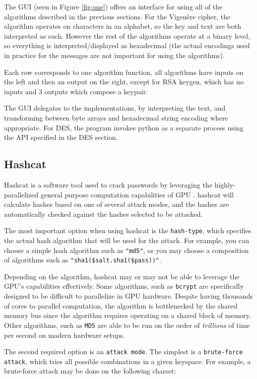 \documentclass[acmlarge]{acmart}
\begin{document}
The GUI (seen in Figure \ref{fig:one}) offers an interface for using all of the algorithms described in the previous sections. For the Vigen\`{e}re cipher, the algorithm operates on characters in an alphabet, so the key and text are both interpreted as such. However the rest of the algorithms operate at a binary level, so everything is interpreted/displayed as hexadecimal (the actual encodings used in practice for the messages are not important for using the algorithms).

Each row corresponds to one algorithm function, all algorithms have inputs on the left and then an output on the right, except for RSA keygen, which has no inputs and 3 outputs which compose a keypair.

The GUI delegates to the implementations, by interpreting the text, and transforming between byte arrays and hexadecimal string encoding where appropriate. For DES, the program invokes python as a separate process using the API specified in the DES section.

\subsection{Hashcat}\label{sec:hashcat}

Hashcat is a software tool used to crack passwords by leveraging the highly-parallelized general purpose computation capabilities of GPU \cite{Hashcat}. hashcat will calculate hashes based on one of several attack modes, and the hashes are automatically checked against the hashes selected to be attacked.

The most important option when using hashcat is the \texttt{hash-type}, which specifies the actual hash algorithm that will be used for the attack. For example, you can choose a simple hash algorithm such as \texttt{"md5"}, or you may choose a composition of algorithms such as \texttt{"sha1(\$salt.sha1(\$pass))"}.

Depending on the algorithm, hashcat may or may not be able to leverage the GPU's capabilities effectively. Some algorithms, such as \texttt{bcrypt} are specifically designed to be difficult to parallelize in GPU hardware. Despite having thousands of cores to parallel computation, the algorithm is bottlenecked by the shared memory bus since the algorithm requires operating on a shared block of memory. Other algorithms, such as \texttt{MD5} are able to be run on the order of \textit{trillions} of time per second on modern hardware setups.

The second required option is an \texttt{attack mode}. The simplest is a \texttt{brute-force attack}, which tries all possible combinations in a given keyspace. For example, a brute-force attack may be done on the following charset:
\end{document}

